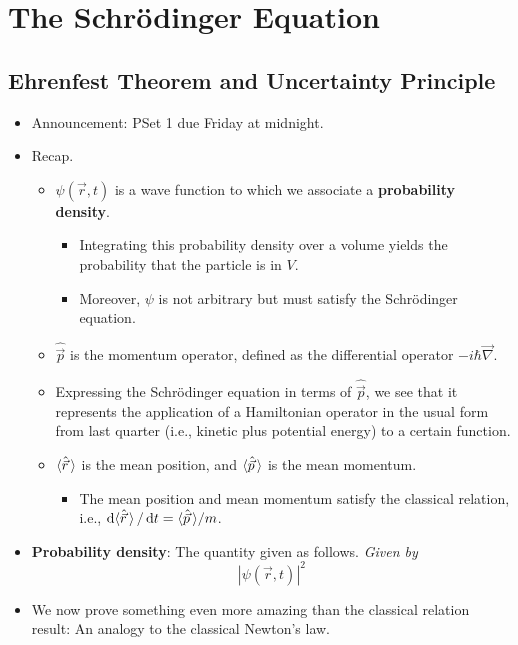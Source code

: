 \documentclass[../notes.tex]{subfiles}
\begin{document}
\chapter{The Schr\"{o}dinger Equation}
\section{Ehrenfest Theorem and Uncertainty Principle}
\begin{itemize}
    \item {}Announcement: PSet 1 due Friday at midnight.
    \item Recap.
    \begin{itemize}
        \item $\psi(\vec{r},t)$ is a wave function to which we associate a \textbf{probability density}.
        \begin{itemize}
            \item Integrating this probability density over a volume yields the probability that the particle is in $V$.
            \item Moreover, $\psi$ is not arbitrary but must satisfy the Schr\"{o}dinger equation.
        \end{itemize}
        \item $\hat{\vec{p}}$ is the momentum operator, defined as the differential operator $-i\hbar\vec{\nabla}$.
        \item Expressing the Schr\"{o}dinger equation in terms of $\hat{\vec{p}}$, we see that it represents the application of a Hamiltonian operator in the usual form from last quarter (i.e., kinetic plus potential energy) to a certain function.
        \item $\langle{\hat{\vec{r}}\,}\rangle$ is the mean position, and $\langle{\hat{\vec{p}}\,}\rangle$ is the mean momentum.
        \begin{itemize}
            \item The mean position and mean momentum satisfy the classical relation, i.e., $\dd{\langle{\hat{\vec{r}}\,}\rangle}/\dd{t}=\langle{\hat{\vec{p}}\,}\rangle/m$.
        \end{itemize}
    \end{itemize}
    \item \textbf{Probability density}: The quantity given as follows. \emph{Given by}
    \begin{equation*}
        |\psi(\vec{r},t)|^2
    \end{equation*}
    \item We now prove something even more amazing than the classical relation result: An analogy to the classical Newton's law.

\end{itemize}
\end{document}
